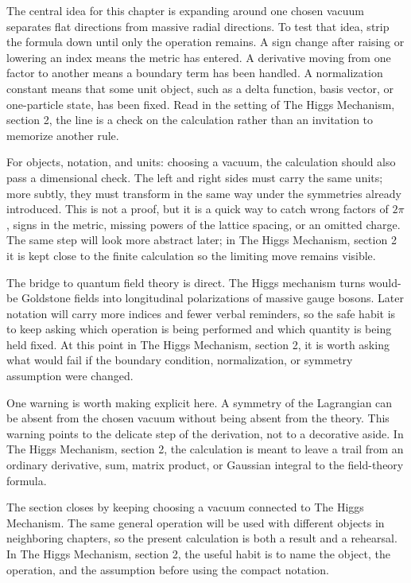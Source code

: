 The central idea for this chapter is expanding around one chosen vacuum separates flat directions from massive radial directions.  To test that idea, strip the formula down until only the operation remains.  A sign change after raising or lowering an index means the metric has entered.  A derivative moving from one factor to another means a boundary term has been handled.  A normalization constant means that some unit object, such as a delta function, basis vector, or one-particle state, has been fixed.  Read in the setting of The Higgs Mechanism, section 2, the line is a check on the calculation rather than an invitation to memorize another rule.

For objects, notation, and units: choosing a vacuum, the calculation should also pass a dimensional check.  The left and right sides must carry the same units; more subtly, they must transform in the same way under the symmetries already introduced.  This is not a proof, but it is a quick way to catch wrong factors of \(2\pi\), signs in the metric, missing powers of the lattice spacing, or an omitted charge.  The same step will look more abstract later; in The Higgs Mechanism, section 2 it is kept close to the finite calculation so the limiting move remains visible.

The bridge to quantum field theory is direct.  The Higgs mechanism turns would-be Goldstone fields into longitudinal polarizations of massive gauge bosons.  Later notation will carry more indices and fewer verbal reminders, so the safe habit is to keep asking which operation is being performed and which quantity is being held fixed.  At this point in The Higgs Mechanism, section 2, it is worth asking what would fail if the boundary condition, normalization, or symmetry assumption were changed.

One warning is worth making explicit here.  A symmetry of the Lagrangian can be absent from the chosen vacuum without being absent from the theory.  This warning points to the delicate step of the derivation, not to a decorative aside.  In The Higgs Mechanism, section 2, the calculation is meant to leave a trail from an ordinary derivative, sum, matrix product, or Gaussian integral to the field-theory formula.

The section closes by keeping choosing a vacuum connected to The Higgs Mechanism.  The same general operation will be used with different objects in neighboring chapters, so the present calculation is both a result and a rehearsal.  In The Higgs Mechanism, section 2, the useful habit is to name the object, the operation, and the assumption before using the compact notation.



